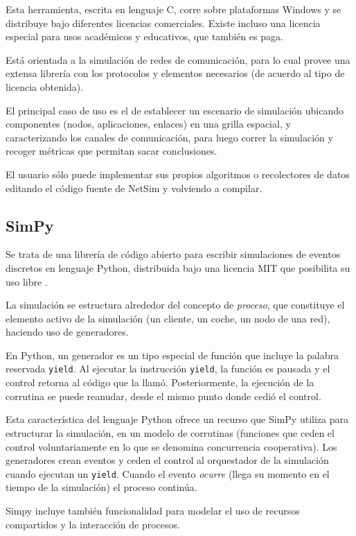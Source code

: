 Esta herramienta, escrita en lenguaje C, corre sobre plataformas Windows y se
distribuye bajo diferentes licencias comerciales. Existe incluso una licencia
especial para usos académicos y educativos, que también es paga.

Está orientada a la simulación de redes de comunicación, para lo cual provee
una extensa librería con los protocolos y elementos necesarios (de acuerdo al
tipo de licencia obtenida).

El principal caso de uso es el de establecer un escenario de simulación
ubicando componentes (nodos, aplicaciones, enlaces) en una grilla espacial, y
caracterizando los canales de comunicación, para luego correr la simulación y
recoger métricas que permitan sacar conclusiones.

El usuario sólo puede implementar sus propios algoritmos o recolectores de
datos editando el código fuente de NetSim y volviendo a compilar.

\subsection{SimPy}

Se trata de una librería de código abierto para escribir simulaciones de
eventos discretos en lenguaje Python, distribuida bajo una licencia MIT que
posibilita su uso libre \cite{sympy}.

La simulación se estructura alrededor del concepto de \textit{proceso}, que
constituye el elemento activo de la simulación (un cliente, un coche, un nodo
de una red), haciendo uso de generadores.

En Python, un generador es un tipo especial de función que incluye la palabra
reservada \verb!yield!. Al ejecutar la instrucción \verb!yield!, la función es
pausada y el control retorna al código que la llamó. Posteriormente, la
ejecución de la corrutina se puede reanudar, desde el mismo punto donde cedió
el control.

Esta característica del lenguaje Python ofrece un recurso que SimPy utiliza
para estructurar la simulación, en un modelo de corrutinas (funciones que ceden
el control voluntariamente en lo que se denomina concurrencia cooperativa). Los
generadores crean eventos y ceden el control al orquestador de la simulación
cuando ejecutan un \verb!yield!. Cuando el evento \textit{ocurre} (llega su
momento en el tiempo de la simulación) el proceso continúa.

Simpy incluye también funcionalidad para modelar el uso de recursos
compartidos y la interacción de procesos.

